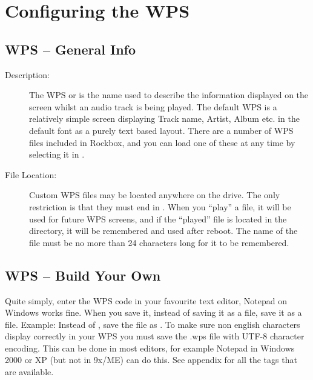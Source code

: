 \section{\label{ref:ConfiguringtheWPS}Configuring the WPS}

\subsection{WPS -- General Info}

\begin{description}
\item[Description: ] The WPS or  is the name used
  to describe the information displayed on the \daps{} screen whilst an audio
  track is being played. The default WPS is a relatively simple screen
  displaying Track name, Artist, Album etc. in the default font as a purely
  text based layout. There are a number of WPS files included in Rockbox, and
  you can load one of these at any time by selecting it in
  .


\item [File Location: ]Custom WPS files may be located anywhere on the drive. 
  The only restriction is that they must end in . When you ``play''
  a  file, it will be used for future WPS screens, and if the 
  ``played''  file is located in the  directory, it 
  will be remembered and used after reboot. The name of the  file must be 
  no more than 24 characters long for it to be remembered.
\end{description}

\subsection{\label{ref:CreateYourOwnWPS}WPS -- Build Your Own}
Quite simply, enter the WPS code in your favourite text editor, Notepad on
Windows works fine. When you save it, instead of saving it as a  
file, save it as a  file. Example: Instead of , 
save the file as . To make sure non english characters 
display correctly in your WPS you must save the .wps file with UTF-8 character 
encoding. This can be done in most editors, for example Notepad in Windows 2000
or XP (but not in 9x/ME) can do this. See appendix  for
all the tags that are available.

